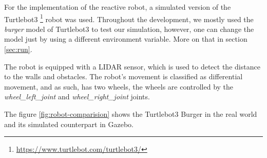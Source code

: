 \documentclass[conference]{IEEEtran}
\begin{document}
For the implementation of the reactive robot, a simulated version of the Turtlebot3 \footnote{\url{https://www.turtlebot.com/turtlebot3/}}
robot was used. Throughout the development, we mostly used the \emph{burger} model of Turtlebot3 to test our simulation, however, one can change the model just by using a different environment variable. More on that in section \ref{sec:run}.

The robot is equipped with a LIDAR sensor, which is used to detect the distance to the walls and obstacles.
The robot's movement is classified as differential movement, and as such, has two wheels, the wheels are controlled by the \emph{wheel\_left\_joint} and \emph{wheel\_right\_joint} joints.

The figure \ref{fig:robot-comparision} shows the Turtlebot3 Burger in the real world and its simulated counterpart
in Gazebo.
\end{document}
